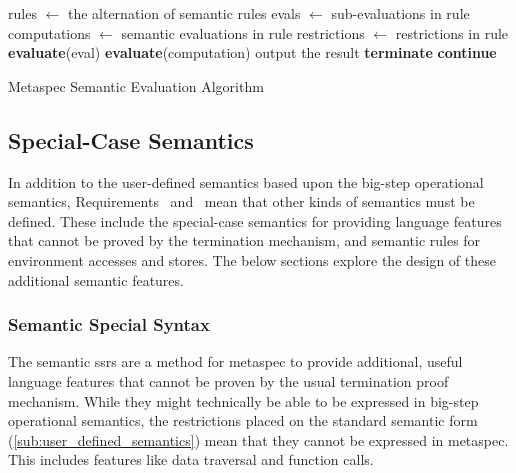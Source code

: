 \begin{algorithm}
\begin{algorithmic}
\State rules $\gets$ the alternation of semantic rules
\State
{}
    \State evals $\gets$ sub-evaluations in rule
    \State computations $\gets$ semantic evaluations in rule
    \State restrictions $\gets$ restrictions in rule
    \State 
        \State \textbf{evaluate}(eval)
    \EndFor
    \State
            \State \textbf{evaluate}(computation)
        \EndFor
        \State
        \State output the result
        \State \textbf{terminate}
    \Else
        \State \textbf{continue}
    \EndIf
\EndFor
\end{algorithmic}
\caption{Metaspec Semantic Evaluation Algorithm}
\label{alg:metaspec_semantic_evaluation_algorithm}
\end{algorithm}



\subsection{Special-Case Semantics} %
\label{sub:special_case_semantics}
In addition to the user-defined semantics based upon the big-step operational semantics, Requirements~ and~ mean that other kinds of semantics must be defined.
These include the special-case semantics for providing language features that cannot be proved by the termination mechanism, and semantic rules for environment accesses and stores.
The below sections explore the design of these additional semantic features.

\subsubsection{Semantic Special Syntax} %
\label{ssub:semantic_special_syntax}

The semantic \glspl{ssr} are a method for \gls{metaspec} to provide additional, useful language features that cannot be proven by the usual termination proof mechanism. 
While they might technically be able to be expressed in big-step operational semantics, the restrictions placed on the standard semantic form (\autoref{sub:user_defined_semantics}) mean that they cannot be expressed in metaspec.
This includes features like data traversal and function calls. \\

